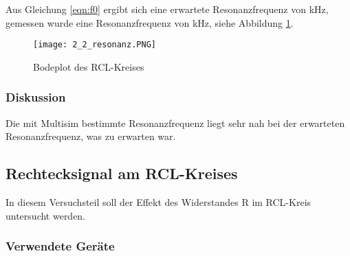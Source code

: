 \documentclass[12pt,a4paper]{article}
\begin{document}
Aus Gleichung \ref{eqn:f0} ergibt sich eine erwartete Resonanzfrequenz von \unit[5,033]{kHz}, gemessen wurde eine Resonanzfrequenz von \unit[5,011]{kHz}, siehe Abbildung \ref{fig:2_2}.

\begin{figure}[H] 
  \centering
    \texttt{[image: 2\_2\_resonanz.PNG]}
  	\caption[Bodeplot des RCL-Kreises]{Bodeplot des RCL-Kreises}
  \label{fig:2_2}
\end{figure}


\subsubsection{Diskussion}

Die mit Multisim bestimmte Resonanzfrequenz liegt sehr nah bei der erwarteten Resonanzfrequenz, was zu erwarten war.


\subsection{Rechtecksignal am RCL-Kreises}

In diesem Versuchsteil soll der Effekt des Widerstandes R im RCL-Kreis untersucht werden.

\subsubsection{Verwendete Geräte}
\end{document}

